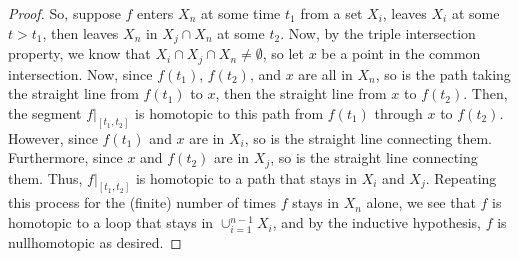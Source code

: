 \documentclass[fontsize=11pt]{scrartcl} %
\numberwithin{equation}{section} %
\numberwithin{figure}{section} %
\numberwithin{table}{section} %
\begin{document}
\begin{proof}
    So, suppose $f$ enters $X_n$ at
    some time $t_1$ from a set $X_i$, leaves $X_i$ at some $t>t_1$, then leaves
    $X_n$ in $X_j\cap X_n$ at some $t_2$. Now, by the triple intersection
    property, we know that $X_i\cap X_j\cap X_n \neq \emptyset$, so let $x$ be a
    point in the common intersection. Now, since $f(t_1)$, $f(t_2)$, and $x$ are
    all in $X_n$, so is the path taking the straight line from $f(t_1)$ to $x$,
    then the straight line from $x$ to $f(t_2)$. Then, the segment
    $f|_{[t_1,t_2]}$ is homotopic to this path from $f(t_1)$ through $x$ to
    $f(t_2)$. However, since $f(t_1)$ and $x$ are in $X_i$, so is the straight
    line connecting them. Furthermore, since $x$ and $f(t_2)$ are in $X_j$, so
    is the straight line connecting them. Thus, $f|_{[t_1,t_2]}$ is homotopic to
    a path that stays in $X_i$ and $X_j$. Repeating this process for the
    (finite) number of times $f$ stays in $X_n$ alone, we see that $f$ is
    homotopic to a loop that stays in $\cup_{i=1}^{n-1}X_i$, and by the
    inductive hypothesis, $f$ is nullhomotopic as desired.

\end{proof}
\end{document}
